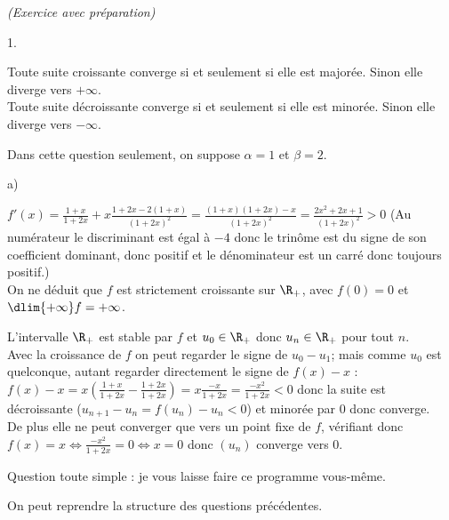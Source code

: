 \documentclass[11pt]{article}%
\begin{document}
\newpage


\begin{exercice}{\it (Exercice avec préparation)}~
  \begin{noliste}{1.}
    \setlength{\itemsep}{4mm}
  \item Toute suite croissante converge si et seulement si elle est
    majorée. Sinon elle diverge vers $ + \infty$. \\
    Toute suite décroissante converge si et seulement si elle est
    minorée.  Sinon elle diverge vers $-\infty$.

  \item Dans cette question seulement, on suppose $\alpha = 1$ et
    $\beta = 2$.
 \begin{noliste}{a)}
   \setlength{\itemsep}{2mm}
 \item $f'(x) = \frac{1 + x}{1 + 2x} + x \frac{1 + 2x - 2(1 + x) }{(1
     + 2x)^{2}} = \frac{(1 + x) (1 + 2x) -x}{(1 + 2x)^{2}} =
   \frac{2x^{2} + 2x + 1}{(1 + 2x)^{2}} >0$ (Au numérateur le
   discriminant est égal à $-4$ donc le trinôme est du signe de son
   coefficient dominant, donc positif
   et le dénominateur est un carré donc toujours positif.) \\
   On ne déduit que $f$ est strictement croissante sur $\R_+ $, avec
   $f(0) = 0$ et $\dlim{+ \infty} f = + \infty$. \\
 \item L'intervalle $\R_+ $ est stable par $f$ et $u_{0} \in \R_+ $
donc $u_{n} \in \R_+ $ pour tout $n$. \\
 Avec la croissance de $f$ on peut regarder le signe de $u_{0} -
u_{1}$; mais comme $u_{0}$ est quelconque, autant regarder directement
le signe de $f(x) - x$ : \\
 $f(x) - x = x \left( \frac{1 + x}{1 + 2x} - \frac{1 + 2x}{1 + 2x}
\right) = x \frac{-x}{1 + 2x} = \frac{-x^{2}}{1 + 2x} < 0$ donc la
suite est décroissante ($u_{n + 1} - u_{n} = f(u_{n}) - u_{n} < 0$) et
minorée par 0 donc converge. \\
 De plus elle ne peut converger que vers un point fixe de $f$,
vérifiant donc $f(x) = x \Leftrightarrow \frac{-x^{2}}{1 + 2x} = 0
\Leftrightarrow x = 0$ donc $(u_{n})$ converge vers 0. \\
 \item Question toute simple : je vous laisse faire ce programme
vous-même. \\
 \end{noliste}
 \item On peut reprendre la structure des questions précédentes.

\end{noliste}
\end{exercice}
\end{document}
